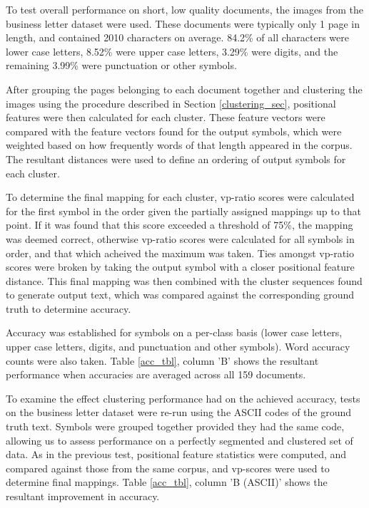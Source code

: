 \documentclass[times, 10pt,twocolumn]{article}
\begin{document}
To test overall performance on short, low quality documents, the images from
the business letter dataset were used.  These documents were typically only 1
page in length, and contained 2010 characters on average.  84.2\% of all
characters were lower case letters, 8.52\% were upper case letters, 3.29\% were
digits, and the remaining 3.99\% were punctuation or other symbols.

After grouping the pages belonging to each document together and clustering 
the images using the procedure described in Section \ref{clustering_sec}, 
positional features were then calculated for each cluster.  These feature 
vectors were compared with the feature vectors found for the output 
symbols, which were weighted based on how frequently words of that length 
appeared in the corpus.  The resultant distances were used to define an 
ordering of output symbols for each cluster.

To determine the final mapping for each cluster, vp-ratio scores were
calculated for the first symbol in the order given the partially assigned
mappings up to that point.  If it was found that this score exceeded a 
threshold of 75\%, the mapping was deemed correct, otherwise vp-ratio scores
were calculated for all symbols in order, and that which acheived the maximum
was taken.  Ties amongst vp-ratio scores were broken by taking the output
symbol with a closer positional feature distance.  This final mapping was then
combined with the cluster sequences found to generate output text, which was
compared against the corresponding ground truth to determine accuracy.

Accuracy was established for symbols on a per-class basis (lower case letters, 
upper case letters, digits, and punctuation and other symbols).  Word accuracy
counts were also taken.  Table \ref{acc_tbl}, column 'B' shows the 
resultant performance when accuracies are averaged across all 159 documents.

To examine the effect clustering performance had on the achieved accuracy,
tests on the business letter dataset were re-run using the ASCII codes of the
ground truth text.  Symbols were grouped together provided they had the same
code, allowing us to assess performance on a perfectly segmented and clustered 
set of data.  As in the previous test, positional feature statistics were
computed, and compared against those from the same corpus, and vp-scores were
used to determine final mappings.  Table \ref{acc_tbl}, column 'B (ASCII)'
shows the resultant improvement in accuracy.
\end{document}
